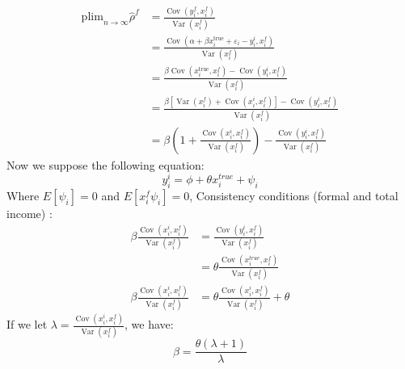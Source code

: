 \documentclass[12pt,oneside]{article}
\theoremstyle{bracket}
\begin{document}
\begin{align*}
\mathrm{plim}_{n \to \infty}\hat{\rho}^{f} &= \frac{\operatorname{Cov}(y_i^f, x_i^f)}{\operatorname{Var}(x_i^f)}\\
 &= \frac{\operatorname{Cov}(\alpha + \beta x^{\text{true}}_i + \varepsilon_i-y_i^i, x_i^f)}{\operatorname{Var}(x_i^f)}\\
 &= \frac{\beta\operatorname{Cov}(x^{\text{true}}_i,x_i^f)- \operatorname{Cov}(y_i^i,x_i^f)}{\operatorname{Var}(x_i^f)}\\
 &= \frac{\beta[\operatorname{Var}(x^f_i)+\operatorname{Cov}(x_i^i,x_i^f)]-\operatorname{Cov}(y_i^i,x_i^f)}{\operatorname{Var}(x_i^f)}\\
 &=\beta(1+\frac{\operatorname{Cov}(x_i^i,x_i^f)}{\operatorname{Var}(x_i^f)})-\frac{\operatorname{Cov}(y_i^i,x_i^f)}{\operatorname{Var}(x_i^f)}
\end{align*}
Now we suppose the following equation:
$$y_i^i = \phi+\theta x_i^{true}+\psi_i$$
Where $E[\psi_i]=0$ and $E[x_i^f\psi_i]=0$,
Consistency conditions (formal and total income) :
\begin{align*}
\beta \frac{\operatorname{Cov}(x_i^i,x_i^f)}{\operatorname{Var}(x_i^f)}&=\frac{\operatorname{Cov}(y_i^i,x_i^f)}{\operatorname{Var}(x_i^f)}\\
&= \theta \frac{\operatorname{Cov}(x_i^{true},x_i^f)}{\operatorname{Var}(x_i^f)}\\
\beta \frac{\operatorname{Cov}(x_i^i,x_i^f)}{\operatorname{Var}(x_i^f)}&= \theta  \frac{\operatorname{Cov}(x_i^{i},x_i^f)}{\operatorname{Var}(x_i^f)}+\theta
\end{align*}
If we let $\lambda = \frac{\operatorname{Cov}(x_i^i,x_i^f)}{\operatorname{Var}(x_i^f)}$, we have:
$$\beta =\frac{\theta(\lambda+1)}{\lambda}$$
\end{document}
